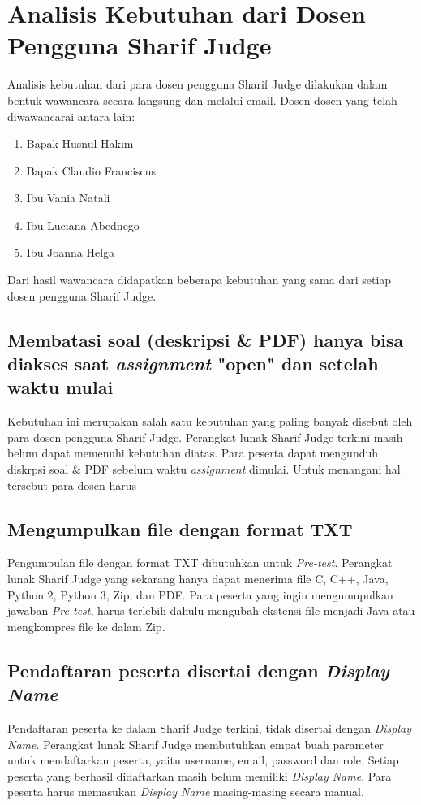 \section{Analisis Kebutuhan dari Dosen Pengguna Sharif Judge}
\label{sec:analisisdosen} 
Analisis kebutuhan dari para dosen pengguna Sharif Judge dilakukan dalam bentuk wawancara secara langsung dan melalui email. Dosen-dosen yang telah diwawancarai antara lain:
\begin{enumerate}
	\item Bapak Husnul Hakim
	\item Bapak Claudio Franciscus
	\item Ibu Vania Natali
	\item Ibu Luciana Abednego
	\item Ibu Joanna Helga
\end{enumerate}
Dari hasil wawancara didapatkan beberapa kebutuhan yang sama dari setiap dosen pengguna Sharif Judge. 

\subsection{Membatasi soal (deskripsi \& PDF) hanya bisa diakses saat \textit{assignment} "open" dan setelah waktu mulai}
Kebutuhan ini merupakan salah satu kebutuhan yang paling banyak disebut oleh para dosen pengguna Sharif Judge. Perangkat lunak Sharif Judge terkini masih belum dapat memenuhi kebutuhan diatas. Para peserta dapat mengunduh diskrpsi soal \& PDF sebelum waktu \textit{assignment} dimulai. Untuk menangani hal tersebut para dosen harus %

\subsection{Mengumpulkan file dengan format TXT}
Pengumpulan file dengan format TXT dibutuhkan untuk \textit{Pre-test}. Perangkat lunak Sharif Judge yang sekarang hanya dapat menerima file C, C++, Java, Python 2, Python 3, Zip, dan PDF. Para peserta yang ingin mengumupulkan jawaban \textit{Pre-test}, harus terlebih dahulu mengubah ekstensi file menjadi Java atau mengkompres file ke dalam Zip.

\subsection{Pendaftaran peserta disertai dengan \textit{Display Name}}
Pendaftaran peserta ke dalam Sharif Judge terkini, tidak disertai dengan \textit{Display Name}. Perangkat lunak Sharif Judge membutuhkan empat buah parameter untuk mendaftarkan peserta, yaitu username, email, password dan role. Setiap peserta yang berhasil didaftarkan masih belum memiliki \textit{Display Name}. Para peserta harus memasukan \textit{Display Name} masing-masing secara manual.

